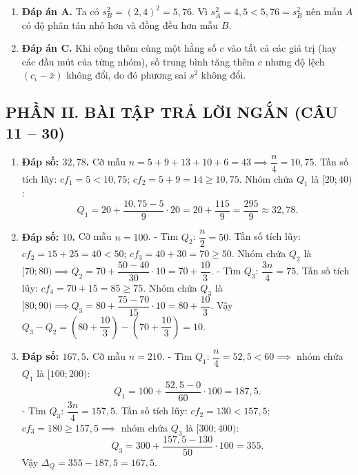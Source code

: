 \documentclass[12pt,a4paper]{article}
\begin{document}
\begin{enumerate}
\item \textbf{Đáp án A.}  
Ta có $s_B^2 = (2{,}4)^2 = 5{,}76$. Vì $s_A^2 = 4{,}5 < 5{,}76 = s_B^2$ nên mẫu $A$ có độ phân tán nhỏ hơn và đồng đều hơn mẫu $B$.

\item \textbf{Đáp án C.}  
Khi cộng thêm cùng một hằng số $c$ vào tất cả các giá trị (hay các đầu mút của từng nhóm), số trung bình tăng thêm $c$ nhưng độ lệch $(c_i - \bar{x})$ không đổi, do đó phương sai $s^2$ không đổi.
\end{enumerate}

\subsection*{PHẦN II. BÀI TẬP TRẢ LỜI NGẮN (CÂU 11 -- 30)}

\begin{enumerate}[start=11]
\item \textbf{Đáp số: $32{,}78$.}  
Cỡ mẫu $n = 5 + 9 + 13 + 10 + 6 = 43 \implies \dfrac{n}{4} = 10{,}75$.  
Tần số tích lũy: $cf_1 = 5 < 10{,}75$; $cf_2 = 5 + 9 = 14 \ge 10{,}75$.  
Nhóm chứa $Q_1$ là $[20; 40)$:  
\[
Q_1 = 20 + \dfrac{10{,}75 - 5}{9} \cdot 20 = 20 + \dfrac{115}{9} = \dfrac{295}{9} \approx 32{,}78.
\]

\item \textbf{Đáp số: $10$.}  
Cỡ mẫu $n = 100$.  
- Tìm $Q_2$: $\dfrac{n}{2} = 50$. Tần số tích lũy: $cf_2 = 15 + 25 = 40 < 50$; $cf_3 = 40 + 30 = 70 \ge 50$.  
Nhóm chứa $Q_2$ là $[70; 80) \implies Q_2 = 70 + \dfrac{50 - 40}{30} \cdot 10 = 70 + \dfrac{10}{3}$.  
- Tìm $Q_3$: $\dfrac{3n}{4} = 75$. Tần số tích lũy: $cf_4 = 70 + 15 = 85 \ge 75$.  
Nhóm chứa $Q_3$ là $[80; 90) \implies Q_3 = 80 + \dfrac{75 - 70}{15} \cdot 10 = 80 + \dfrac{10}{3}$.  
Vậy $Q_3 - Q_2 = \left(80 + \dfrac{10}{3}\right) - \left(70 + \dfrac{10}{3}\right) = 10$.

\item \textbf{Đáp số: $167{,}5$.}  
Cỡ mẫu $n = 210$.  
- Tìm $Q_1$: $\dfrac{n}{4} = 52{,}5 < 60 \implies$ nhóm chứa $Q_1$ là $[100; 200)$:  
\[
Q_1 = 100 + \dfrac{52{,}5 - 0}{60} \cdot 100 = 187{,}5.
\]
- Tìm $Q_3$: $\dfrac{3n}{4} = 157{,}5$. Tần số tích lũy: $cf_2 = 130 < 157{,}5$; $cf_3 = 180 \ge 157{,}5 \implies$ nhóm chứa $Q_3$ là $[300; 400)$:  
\[
Q_3 = 300 + \dfrac{157{,}5 - 130}{50} \cdot 100 = 355.
\]
Vậy $\Delta_Q = 355 - 187{,}5 = 167{,}5$.


\end{enumerate}
\end{document}
